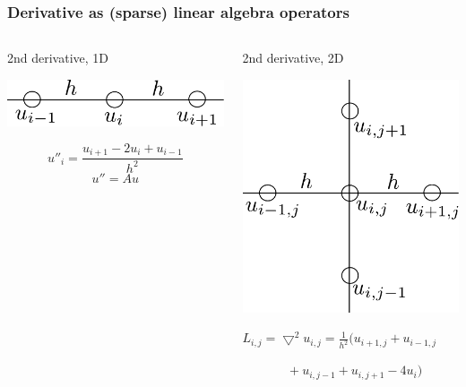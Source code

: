 \documentclass{beamer}
\begin{document}
\begin{frame}[fragile]
  \frametitle{Derivative as (sparse) linear algebra operators}

  \begin{columns}
    \begin{block}{2nd derivative, 1D}

      \includegraphics[width=\linewidth]{slides-figures/1d.pdf}

      $$u''_i = \frac{u_{i+1}-2u_i+u_{i-1}}{h^2}$$
      $$u'' = Au$$
    \end{block}
    
    \begin{block}{2nd derivative, 2D}
      \begin{center}
        \includegraphics[width=.6\linewidth]{slides-figures/2d.pdf}
      \end{center}
      
        $L_{i,j} = \bigtriangledown^2 u_{i,j} = \frac{1}{h^2} (u_{i+1,j}  +u_{i-1,j}$
        
        $~~~~~~~~~~~~~~~~+u_{i,j-1}+u_{i,j+1}-4u_i)$
    \end{block}    
    
  \end{columns}
\end{frame}
\end{document}
